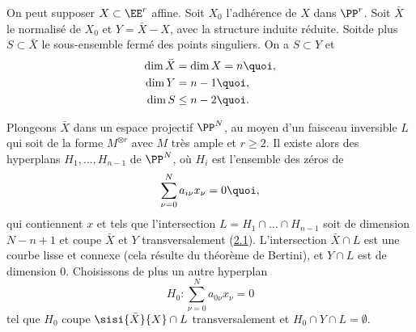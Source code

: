 \documentclass[10pt]{../fichiers-configuration-latex/smfart}
\begin{document}
On peut supposer $X\subset \EE^r$ affine. Soit $X_0$
l'adhérence de $X$ dans $\PP^r$. Soit $\bar{X}$ le normalisé de
$X_0$ et $Y=\bar{X}-X$, avec la structure induite
réduite. Soit\pageoriginale de plus $S\subset \bar{X}$ le
sous-ensemble fermé des points singuliers. On a $S\subset Y$ et
\begin{align*}
\dim \bar{X} &= \dim X=n{\quoi},\\
\dim Y &= n-1{\quoi},\\
\dim S &\leq n-2{\quoi}.
\end{align*}

Plongeons $\bar{X}$ dans un espace projectif $\PP^N$, au moyen
d'un faisceau inversible $L$ qui soit de la forme $M^{\otimes r}$ avec
$M$ très ample et $r\geq 2$. Il existe alors des hyperplans %
$H_1,\ldots, H_{n-1}$ de $\PP^N$, où $H_i$ est l'ensemble des
zéros de
$$
\sum^N_{\nu =0}a_{i\nu} x_{\nu} =0{\quoi},
$$
qui contiennent $x$ et tels que l'intersection $L=H_1\cap\ldots \cap
H_{n-1}$ soit de dimension $N-n+1$ et coupe $\bar{X}$ et $Y$
transversalement (\hyperref[XI.thm2.1]{2.1}). %
L'intersection $\bar{X}\cap L$ est une courbe
lisse et connexe (cela résulte du théorème de Bertini), et $Y\cap L$
est de dimension $0$. Choisissons de plus un autre hyperplan
$$
H_0:\sum^N_{\nu=0}a_{0 \nu}x_{\nu}=0
$$
tel que $H_0$ coupe $\sisi{\bar{X}}{X}\cap L$ transversalement et $H_0\cap
Y\cap L=∅$. %
\end{document}
